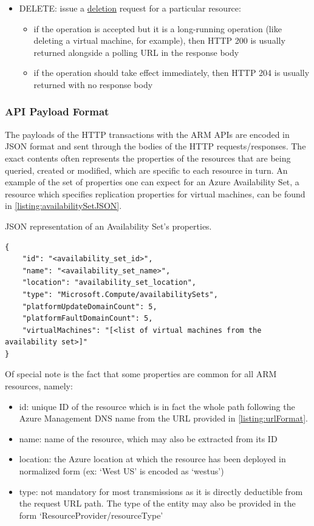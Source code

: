\documentclass[11pt]{report}
\begin{document}
\begin{itemize}
    \item{DELETE}: issue a \ul{deletion} request for a particular resource:
        \begin{itemize}
            \item{} if the operation is accepted but it is a long-running
                operation (like deleting a virtual machine, for example), then
                HTTP 200 is usually returned alongside a polling URL in the
                response body
            \item{} if the operation should take effect immediately, then HTTP
                204 is usually returned with no response body
        \end{itemize}
\end{itemize}

\subsubsection{API Payload Format}

The payloads of the HTTP transactions with the ARM APIs are encoded in JSON
format and sent through the bodies of the HTTP requests/responses. The exact
contents often represents the properties of the resources that are being
queried, created or modified, which are specific to each resource in turn.
An example of the set of properties one can expect for an Azure
Availability Set, a resource which specifies replication properties for virtual
machines, can be found in \autoref{listing:availabilitySetJSON}.

\begin{listing}[H]
\caption{JSON representation of an Availability Set's properties.}
\label{listing:availabilitySetJSON}
\begin{verbatim}
{
    "id": "<availability_set_id>",
    "name": "<availability_set_name>",
    "location": "availability_set_location",
    "type": "Microsoft.Compute/availabilitySets",
    "platformUpdateDomainCount": 5,
    "platformFaultDomainCount": 5,
    "virtualMachines": "[<list of virtual machines from the availability set>]"
}
\end{verbatim}
\end{listing}

Of special note is the fact that some properties are common for all ARM
resources, namely:

\begin{itemize}
    \item{id}: unique ID of the resource which is in fact the whole path
        following the Azure Management DNS name from the URL provided in
        \autoref{listing:urlFormat}.
    \item{name}: name of the resource, which may also be extracted from its ID
    \item{location}: the Azure location at which the resource has been
        deployed in normalized form (ex: `West US' is encoded as `westus')
    \item{type}: not mandatory for most transmissions as it is
        directly deductible from the request URL path. The type of the
        entity may also be provided in the form
        `ResourceProvider/resourceType'
\end{itemize}
\end{document}
